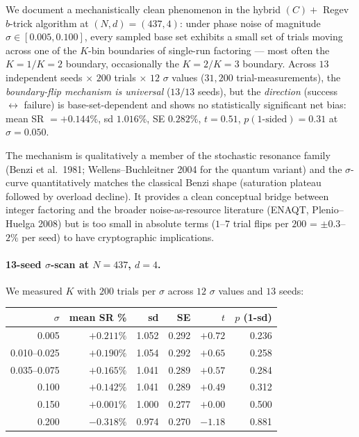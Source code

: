\documentclass[11pt]{article}
\begin{document}
We document a mechanistically clean phenomenon in the hybrid $(C) + $ Regev $b$-trick algorithm at $(N, d) = (437, 4)$: under phase noise of magnitude $\sigma \in [0.005, 0.100]$, every sampled base set exhibits a small set of trials moving across one of the $K$-bin boundaries of single-run factoring --- most often the $K = 1 / K = 2$ boundary, occasionally the $K = 2 / K = 3$ boundary. Across $13$ independent seeds $\times$ $200$ trials $\times$ $12$ $\sigma$ values ($31{,}200$ trial-measurements), the \emph{boundary-flip mechanism is universal} ($13/13$ seeds), but the \emph{direction} (success $\leftrightarrow$ failure) is base-set-dependent and shows no statistically significant net bias: mean SR $= +0.144\%$, sd $1.016\%$, SE $0.282\%$, $t = 0.51$, $p (\text{1-sided}) = 0.31$ at $\sigma = 0.050$.

The mechanism is qualitatively a member of the stochastic resonance family (Benzi et al.\ 1981; Wellens--Buchleitner 2004 for the quantum variant) and the $\sigma$-curve quantitatively matches the classical Benzi shape (saturation plateau followed by overload decline). It provides a clean conceptual bridge between integer factoring and the broader noise-as-resource literature (ENAQT, Plenio--Huelga 2008) but is too small in absolute terms ($1$--$7$ trial flips per $200$ = $\pm 0.3$--$2\%$ per seed) to have cryptographic implications.

\paragraph{13-seed $\sigma$-scan at $N = 437$, $d = 4$.}
We measured $K$ with $200$ trials per $\sigma$ across $12$ $\sigma$ values and $13$ seeds:

\begin{center}
\begin{tabular}{rrrrrr}
\toprule
$\sigma$ & mean SR \% & sd & SE & $t$ & $p$ (1-sd) \\
\midrule
0.005 & $+0.211\%$ & 1.052 & 0.292 & $+0.72$ & 0.236 \\
0.010--0.025 & $+0.190\%$ & 1.054 & 0.292 & $+0.65$ & 0.258 \\
0.035--0.075 & $+0.165\%$ & 1.041 & 0.289 & $+0.57$ & 0.284 \\
0.100 & $+0.142\%$ & 1.041 & 0.289 & $+0.49$ & 0.312 \\
0.150 & $+0.001\%$ & 1.000 & 0.277 & $+0.00$ & 0.500 \\
0.200 & $-0.318\%$ & 0.974 & 0.270 & $-1.18$ & 0.881 \\
\bottomrule
\end{tabular}
\end{center}
\end{document}
